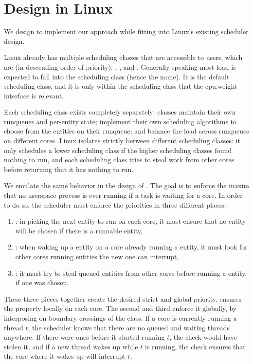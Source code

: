 \section{\beclass{} Design in Linux}\label{s:design}

We design \beclass{} to implement our approach while fitting into Linux's existing
scheduler design.

Linux already has multiple scheduling classes that are accessible to users,
which are (in descending order of priority): \deadlineclass{}, \fifoclass{}, and
\normalclass{}. Generally speaking most load is expected to fall into the
\normalclass{} scheduling class (hence the name). It is the default scheduling
class, and it is only within the \normalclass{} scheduling class that the
\cgroups{} cpu.weight interface is relevant.

Each scheduling class exists completely separately: classes maintain their own
runqueues and per-entity state; implement their own scheduling algorithms to
choose from the entities on their runqueue; and balance the load across
runqueues on different cores. Linux isolates strictly between different
scheduling classes: it only schedules a lower scheduling class if the higher
scheduling classes found nothing to run, and each scheduling class tries to
steal work from other cores before returning that it has nothing to run. 

We emulate the same behavior in the design of \beclass{}. The goal is to enforce
the maxim that no \beclass{} userspace process is ever running if a
\normalclass{} task is waiting for a core. In order to do so, the scheduler must
enforce the priorities in three different places:
\begin{enumerate}
    \item \local: in picking the next entity to run on each core, it must ensure
        that no \beclass{} entity will be chosen if there is a runnable
        \normalclass{} entity,
    \item \entry: when waking up a \normalclass{} entity on a core already
        running a \normalclass{} entity, it must look for other cores running
        \beclass{} entities the new one can interrupt,
    \item \exit: it must try to steal queued \normalclass{} entities from other
        cores before running a \beclass{} entity, if one was chosen.
\end{enumerate}

These three pieces together create the desired strict and global priority.
\local{} ensures the property locally on each core. The second and third enforce
it globally, by interposing on boundary crossings of the \normalclass{} class.
If a core is currently running a \beclass{} thread $t$, the scheduler knows that
there are no queued and waiting \normalclass{} threads anywhere. If there were
ones before it started running $t$, the \exit{} check would have stolen it, and
if a new \normalclass{} thread wakes up while $t$ is running, the \entry{} check
ensures that the core where it wakes up will interrupt $t$.


